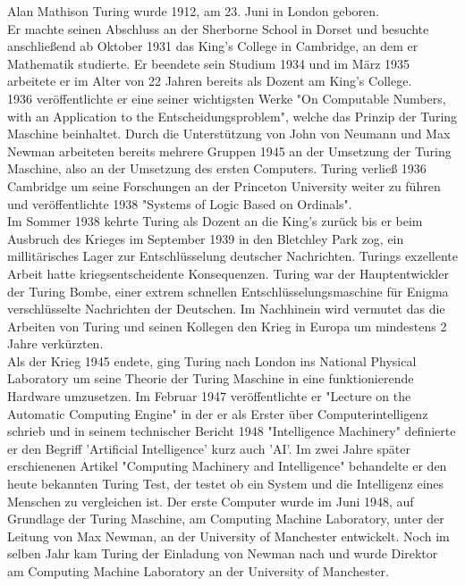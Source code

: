 Alan Mathison Turing wurde 1912, am 23. Juni in London geboren.\\
Er machte seinen Abschluss an der Sherborne School in Dorset und besuchte anschließend ab Oktober 1931 das King's College in Cambridge, an dem er Mathematik studierte. Er beendete sein Studium 1934 und im März 1935 arbeitete er im Alter von 22 Jahren bereits als Dozent am King's College.\\
1936 veröffentlichte er eine seiner wichtigsten Werke "On Computable Numbers, with an Application to the Entscheidungsproblem", welche das Prinzip der Turing Maschine beinhaltet. Durch die Unterstützung von John von Neumann und Max Newman arbeiteten bereits mehrere Gruppen 1945 an der Umsetzung der Turing Maschine, also an der Umsetzung des ersten Computers. Turing verließ 1936 Cambridge um seine Forschungen an der Princeton University weiter zu führen und veröffentlichte 1938 "Systems of Logic Based on Ordinals".\\ 
Im Sommer 1938 kehrte Turing als Dozent an die King's zurück bis er beim Ausbruch des Krieges im September 1939 in den Bletchley Park zog, ein millitärisches Lager zur Entschlüsselung deutscher Nachrichten. Turings exzellente Arbeit hatte kriegsentscheidente Konsequenzen. Turing war der Hauptentwickler der Turing Bombe, einer extrem schnellen Entschlüsselungsmaschine für Enigma verschlüsselte Nachrichten der Deutschen. Im Nachhinein wird vermutet das die Arbeiten von Turing und seinen Kollegen den Krieg in Europa um mindestens 2 Jahre verkürzten.\\
Als der Krieg 1945 endete, ging Turing nach London ins National Physical Laboratory um seine Theorie der Turing Maschine in eine funktionierende Hardware umzusetzen. Im Februar 1947 veröffentlichte er "Lecture on the Automatic Computing Engine" in der er als Erster über Computerintelligenz schrieb und in seinem technischer Bericht 1948 "Intelligence Machinery" definierte er den Begriff 'Artificial Intelligence' kurz auch 'AI'. Im zwei Jahre später erschienenen Artikel "Computing Machinery and Intelligence" behandelte er den heute bekannten Turing Test, der testet ob ein System und die Intelligenz eines Menschen zu vergleichen ist.
Der erste Computer wurde im Juni 1948, auf Grundlage der Turing Maschine, am Computing Machine Laboratory, unter der Leitung von Max Newman, an der University of Manchester entwickelt. Noch im selben Jahr kam Turing der Einladung von Newman nach und wurde Direktor am Computing Machine Laboratory an der University of Manchester.\\
